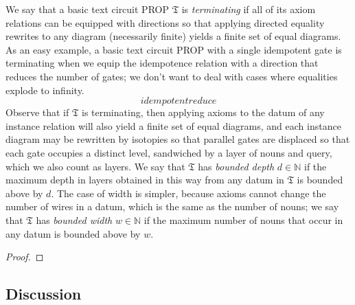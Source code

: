 \begin{fullwidth}
\begin{defn}
We say that a basic text circuit PROP $\mathfrak{T}$ is \emph{terminating} if all of its axiom relations can be equipped with directions so that applying directed equality rewrites to any diagram (necessarily finite) yields a finite set of equal diagrams. As an easy example, a basic text circuit PROP with a single idempotent gate is terminating when we equip the idempotence relation with a direction that reduces the number of gates; we don't want to deal with cases where equalities explode to infinity.
\[idempotentreduce\]
Observe that if $\mathfrak{T}$ is terminating, then applying axioms to the datum of any instance relation will also yield a finite set of equal diagrams, and each instance diagram may be rewritten by isotopies so that parallel gates are displaced so that each gate occupies a distinct level, sandwiched by a layer of nouns and query, which we also count as layers. We say that $\mathfrak{T}$ has \emph{bounded depth} $d \in \mathbb{N}$ if the maximum depth in layers obtained in this way from any datum in $\mathfrak{T}$ is bounded above by $d$. The case of width is simpler, because axioms cannot change the number of wires in a datum, which is the same as the number of nouns; we say that $\mathfrak{T}$ has \emph{bounded width} $w \in \mathbb{N}$ if the maximum number of nouns that occur in any datum is bounded above by $w$.
\end{defn}

\begin{theorem}
\begin{proof}

\end{proof}
\end{theorem}

\subsection{Discussion}

\begin{example}[]

\end{example}

\end{fullwidth}